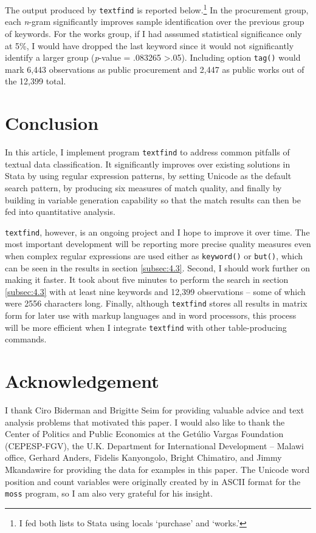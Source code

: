 The output produced by {\tt textfind} is reported below.\footnote{I fed both lists to Stata using locals `purchase' and `works.'} In the procurement group, each {\it n}-gram significantly improves sample identification over the previous group of keywords. For the works group, if I had asssumed statistical significance only at 5\%, I would have dropped the last keyword since it would not significantly identify a larger group ({\it p}-value = .083265 \textgreater \space .05). Including option {\tt tag()} would mark 6,443 observations as public procurement and 2,447 as public works out of the 12,399 total.

\begin{stlog}
\nullskip
\end{stlog}

\section[Conclusion]{Conclusion}
In this article, I implement program {\tt textfind} to address common pitfalls of textual data classification. It significantly improves over existing solutions in Stata by using regular expression patterns, by setting Unicode as the default search pattern, by producing six measures of match quality, and finally by building in variable generation capability so that the match results can then be fed into quantitative analysis.

{\tt textfind}, however, is an ongoing project and I hope to improve it over time. The most important development will be reporting more precise quality measures even when complex regular expressions are used either as {\tt keyword()} or {\tt but()}, which can be seen in the results in section \ref{subsec:4.3}. Second, I should work further on making it faster. It took about five minutes to perform the search in section \ref{subsec:4.3} with at least nine keywords and 12,399 observations -- some of which were 2556 characters long. Finally, although {\tt textfind} stores all results in matrix form for later use with markup languages and in word processors, this process will be more efficient when I integrate {\tt textfind} with other table-producing commands.




\newpage
\section*{Acknowledgement}
I thank Ciro Biderman and Brigitte Seim for providing valuable advice and text analysis problems that motivated this paper. I would also like to thank the Center of Politics and Public Economics at the Get\'ulio Vargas Foundation (CEPESP-FGV), the U.K. Department for International Development -- Malawi office, Gerhard Anders, Fidelis Kanyongolo, Bright Chimatiro, and Jimmy Mkandawire for providing the data for examples in this paper. The Unicode word position and count variables were originally created by \cite{CoxStatatip982011} in ASCII format for the {\tt moss} program, so I am also very grateful for his insight.

\endinput
